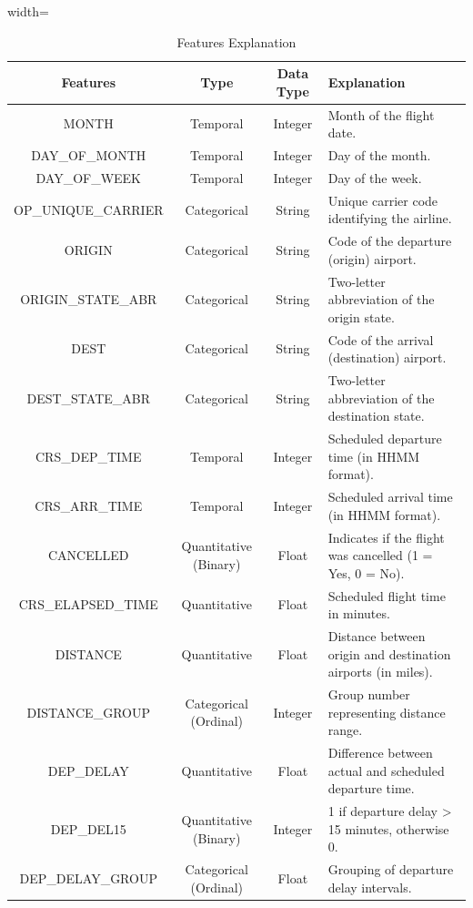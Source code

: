 \documentclass[a4paper,12pt]{report}
\begin{document}
\begin{table}[H]
\centering
\begin{adjustbox}{width=\textwidth}
\begin{tabular}{|c|c|c|l|}
\hline
\textbf{Features} & \textbf{Type} & \textbf{Data Type} & \textbf{Explanation}\\
\hline
MONTH & Temporal & Integer & Month of the flight date. \\ 
\hline
DAY\_OF\_MONTH & Temporal & Integer & Day of the month. \\ 
\hline
DAY\_OF\_WEEK & Temporal & Integer & Day of the week. \\ 
\hline
OP\_UNIQUE\_CARRIER & Categorical & String & Unique carrier code identifying the airline. \\ 
\hline
ORIGIN & Categorical & String & Code of the departure (origin) airport. \\ 
\hline
ORIGIN\_STATE\_ABR & Categorical & String & Two-letter abbreviation of the origin state. \\ 
\hline
DEST & Categorical & String & Code of the arrival (destination) airport. \\ 
\hline
DEST\_STATE\_ABR & Categorical & String & Two-letter abbreviation of the destination state. \\ 
\hline
CRS\_DEP\_TIME & Temporal & Integer & Scheduled departure time (in HHMM format). \\ 
\hline
CRS\_ARR\_TIME & Temporal & Integer & Scheduled arrival time (in HHMM format). \\ 
\hline
CANCELLED & Quantitative (Binary) & Float & Indicates if the flight was cancelled (1 = Yes, 0 = No). \\ 
\hline
CRS\_ELAPSED\_TIME & Quantitative & Float & Scheduled flight time in minutes. \\ 
\hline
DISTANCE & Quantitative & Float & Distance between origin and destination airports (in miles). \\ 
\hline
DISTANCE\_GROUP & Categorical (Ordinal) & Integer & Group number representing distance range. \\ 
\hline
DEP\_DELAY & Quantitative & Float & Difference between actual and scheduled departure time. \\ 
\hline
DEP\_DEL15 & Quantitative (Binary) & Integer & 1 if departure delay > 15 minutes, otherwise 0. \\ 
\hline
DEP\_DELAY\_GROUP & Categorical (Ordinal) & Float & Grouping of departure delay intervals. \\ 
\hline
\end{tabular}
\end{adjustbox}
\caption{Features Explanation}
\end{table}
\end{document}
